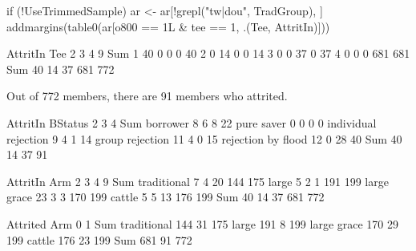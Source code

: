 \begin{Schunk}
\begin{Sinput}
if (!UseTrimmedSample) ar <- ar[!grepl("tw|dou", TradGroup), ]
addmargins(table0(ar[o800 == 1L & tee == 1, .(Tee, AttritIn)]))
\end{Sinput}
\begin{Soutput}
     AttritIn
Tee     2   3   4   9 Sum
  1    40   0   0   0  40
  2     0  14   0   0  14
  3     0   0  37   0  37
  4     0   0   0 681 681
  Sum  40  14  37 681 772
\end{Soutput}
\end{Schunk}
Out of 772 members, there are 91 members who attrited.
\begin{Schunk}
\begin{Soutput}
                      AttritIn
BStatus                 2  3  4 Sum
  borrower              8  6  8  22
  pure saver            0  0  0   0
  individual rejection  9  4  1  14
  group rejection      11  4  0  15
  rejection by flood   12  0 28  40
  Sum                  40 14 37  91
\end{Soutput}
\end{Schunk}



\begin{Schunk}
\begin{Soutput}
             AttritIn
Arm             2   3   4   9 Sum
  traditional   7   4  20 144 175
  large         5   2   1 191 199
  large grace  23   3   3 170 199
  cattle        5   5  13 176 199
  Sum          40  14  37 681 772
\end{Soutput}
\end{Schunk}
\begin{Schunk}
\begin{Soutput}
             Attrited
Arm             0   1 Sum
  traditional 144  31 175
  large       191   8 199
  large grace 170  29 199
  cattle      176  23 199
  Sum         681  91 772
\end{Soutput}
\end{Schunk}




